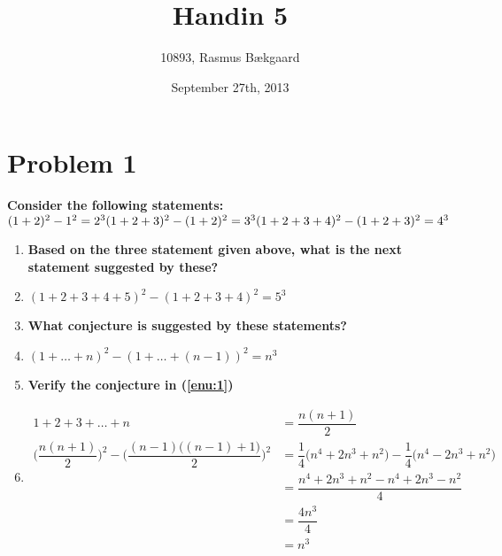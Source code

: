 \documentclass[english,11pt,a4paper]{article}
\title{Handin 5}
\author{10893, Rasmus Bækgaard}
\date{September 27th, 2013}
\begin{document}
\maketitle

\section*{Problem 1}
\textbf{Consider the following statements:}
\\
$(1+2)^2-1^2=2^3\\
(1+2+3)^2-(1+2)^2=3^3\\
(1+2+3+4)^2-(1+2+3)^2=4^3$
\begin{enumerate}[a]
\item \textbf{Based on the three statement given above, what is the next statement suggested by these?}
\item[] $(1+2+3+4+5)^2-(1+2+3+4)^2=5^3$
\item \label{enu:1}\textbf{What conjecture is suggested by these statements?}
\item[] $(1+\ldots+n)^2-(1+\ldots+(n-1))^2=n^3$
\item \textbf{Verify the conjecture in (\ref{enu:1})}
\item[] 
\begin{align}
1+2+3+\ldots+n&=\dfrac{n(n+1)}{2}\\
\bigg(\dfrac{n(n+1)}{2}\bigg)^2-\Bigg(\dfrac{(n-1)\Big((n-1)+1\Big)}{2}\Bigg)^2
	&=\dfrac{1}{4}\Big(n^4+2n^3+n^2\Big)-\dfrac{1}{4}\Big(n^4-2n^3+n^2\Big)\\
	&=\dfrac{n^4+2n^3+n^2-n^4+2n^3-n^2}{4}\\
	&=\dfrac{4n^3}{4}\\
	&=n^3
\end{align}
\end{enumerate}
\end{document}
